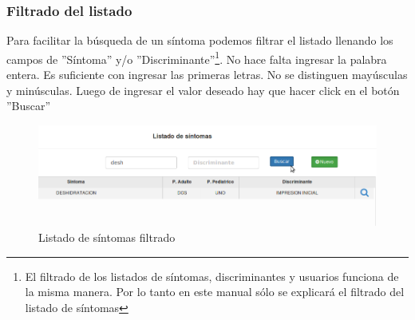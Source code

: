 \subsubsection{Filtrado del listado}
Para facilitar la búsqueda de un síntoma podemos filtrar el listado llenando los campos de ''Síntoma'' y/o ''Discriminante''\footnote{El filtrado de los listados de síntomas, discriminantes y usuarios funciona de la misma manera. Por lo tanto en este manual sólo se explicará el filtrado del listado de síntomas}. No hace falta ingresar la palabra entera. Es suficiente con ingresar las primeras letras. No se distinguen mayúsculas y minúsculas. Luego de ingresar el valor deseado hay que hacer click en el botón ''Buscar''

\begin{figure}[h]
\centerline{\includegraphics[width=1\textwidth]{sintomas_listado_filtro.png}}
\caption{Listado de síntomas filtrado}
\end{figure}

